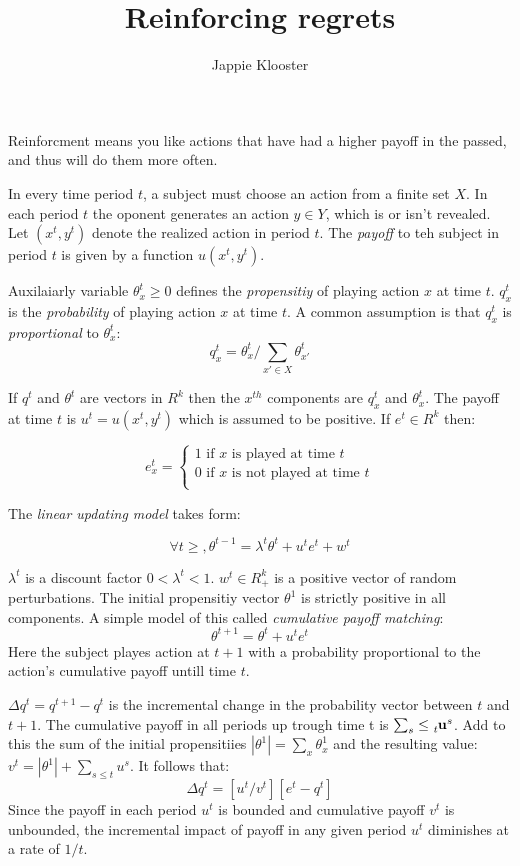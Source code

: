 \documentclass{article}
\begin{document}
\author{Jappie Klooster}
\title{Reinforcing regrets}

\maketitle

Reinforcment means you like actions that have had a higher payoff in the passed,
and thus will do them more often.

In every time period $t$, a subject must choose an action from a finite set $X$.
In each period $t$ the oponent generates an action $y \in Y$, which is
or isn't revealed. Let $(x^t, y^t)$ denote the realized action in period $t$.
The \emph{payoff} to teh subject in period $t$ is given by a function
$u(x^t, y^t)$.

Auxilaiarly variable $\theta^t_x \geq 0$ defines the \emph{propensitiy} of playing
action $x$ at time $t$. $q^t_x$ is the \emph{probability} of playing action $x$
at time $t$. A common assumption is that $q^t_x$ is \emph{proportional} to
$\theta^t_x$:
\[q^t_x=\theta^t_x/\sum_{x'\in X} \theta^t_{x'}\]

If $q^t$ and $\theta^t$ are vectors in $R^k$ then the $x^{th}$ components are
$q^t_x$ and $\theta^t_x$.
The payoff at time $t$ is $u^t=u(x^t,y^t)$ which is assumed to be positive.
If $e^t \in R^k$ then:

\[e^t_x = 
\begin{cases}
	1 \text{ if } x \text{ is played at time } t \\
	0 \text{ if } x \text{ is not played at time } t \\
\end{cases}\]

The \emph{linear updating model} takes form:

\[\forall t \geq, \theta^{t-1}=\lambda^t\theta^t+u^te^t+w^t\]

$\lambda^t$ is a discount factor $0 < \lambda^t < 1$. $w^t \in R^k_+$ is
a positive vector of random perturbations. The initial propensitiy vector
$\theta^1$ is strictly positive in all components. A simple model of this
called \emph{cumulative payoff matching}:
\[\theta^{t+1}=\theta^t+u^te^t\]
Here the subject playes action at $t+1$ with a probability proportional to
the action's cumulative payoff untill time $t$.

$\Delta q^t = q^{t+1} - q^t$ is the incremental change in the probability
vector between $t$ and $t+1$. The cumulative payoff in all periods up trough
time t is $\sum_s \leq \tensor*[_t]{\mathbf{u}}{^s}$. Add to this the sum
of the initial propensitiies $|\theta^1|=\sum_x\theta^1_x$ and the resulting
value: $v^t=|\theta^1|+\sum_{s\leq t}u^s$. It follows that:
\[\Delta q^t=[u^t/v^t][e^t-q^t]\]
Since the payoff in each period $u^t$ is bounded and cumulative payoff $v^t$
is unbounded, the incremental impact of payoff in any given period $u^t$ 
diminishes at a rate of $1/t$.
\end{document}
